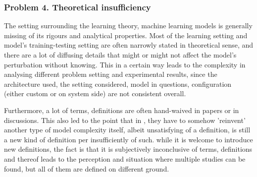 \documentclass[
  journal=largetwo,
  year=2025,
  volume=37,
]{cup-journal}
\begin{document}
\subsubsection*{Problem 4. Theoretical insufficiency}

The setting surrounding the learning theory, machine learning models is generally missing of its rigours and analytical properties. Most of the learning setting and model's training-testing setting are often narrowly stated in theoretical sense, and there are a lot of diffusing details that might or might not affect the model's perturbation without knowing. This in a certain way leads to the complexity in analysing different problem setting and experimental results, since the architecture used, the setting considered, model in questions, configuration (either custom or on system side) are not consistent overall. 

Furthermore, a lot of terms, definitions are often hand-waived in papers or in discussions. This also led to the point that in \cite{nakkiran_deep_2019}, they have to somehow 'reinvent' another type of model complexity itself, albeit unsatisfying of a definition, is still a new kind of definition per insufficiently of such. while it is welcome to introduce new definitions, the fact is that it is subjectively inconclusive of terms, definitions and thereof leads to the perception and situation where multiple studies can be found, but all of them are defined on different ground.
\end{document}
